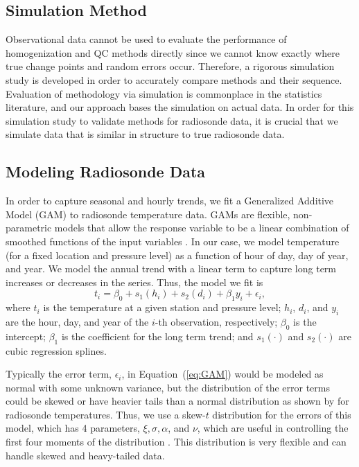 \documentclass[12pt]{article}
\def\ni{\noindent}
\begin{document}
\begin{doublespacing}

\section{Simulation Method}
Observational data cannot be used to evaluate the performance of  homogenization and QC methods directly since we cannot know exactly where true change points and random errors occur.  Therefore, a rigorous simulation study is developed in order to accurately compare methods and their sequence.  Evaluation of methodology via simulation is commonplace in the statistics literature, and our approach bases the simulation on actual data.  In order for this simulation study to validate methods for radiosonde data, it is crucial that we simulate data that is similar in structure to true radiosonde data.

\subsection{Modeling Radiosonde Data}
\label{ssec:model}

In order to capture seasonal and hourly trends, we fit a Generalized Additive Model (GAM) to  radiosonde temperature data.  GAMs are flexible, non-parametric models that allow the response variable to be a linear combination of smoothed functions of the input variables \cite{hastie90}.  In our case, we model temperature (for a fixed location and pressure level) as a function of hour of day, day of year, and year.  We model the annual trend with a linear term to capture long term increases or decreases in the series.  Thus, the model we fit is
\begin{equation} \label{eq:GAM}
	t_i = \beta_0 + s_1(h_i) + s_2(d_i) + \beta_1 y_i + \epsilon_i,
\end{equation}
\ni where $t_i$ is the temperature at a given station and pressure level; $h_i$, $d_i$, and $y_i$ are the hour, day, and year of the $i$-th observation, respectively; $\beta_0$ is the intercept; $\beta_1$ is the coefficient for the long term trend; and $s_1(\cdot)$ and $s_2(\cdot)$ are cubic regression splines.

Typically the error term, $\epsilon_i$, in Equation~(\ref{eq:GAM}) would be modeled as normal with some unknown variance, but the distribution of the error terms could be skewed or have heavier tails than a normal distribution as shown by \cite{bell14} for radiosonde temperatures.  Thus, we use a skew-$t$ distribution for the errors of this model, which has 4 parameters, $\xi, \sigma, \alpha$, and $\nu$, which are useful in controlling the first four moments of the distribution \cite{azzalini03}.  This distribution is very flexible and can handle skewed and heavy-tailed data.


\end{doublespacing}
\end{document}
